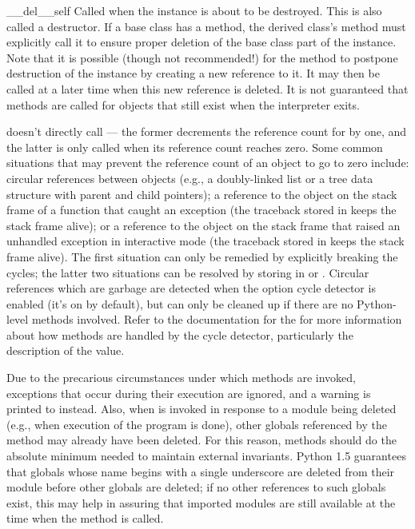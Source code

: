 \begin{methoddesc}[object]{__del__}{self}
Called when the instance is about to be destroyed.  This is also
called a destructor.  If a base class
has a  method, the derived class's  method
must explicitly call it to ensure proper deletion of the base class
part of the instance.  Note that it is possible (though not recommended!)
for the 
method to postpone destruction of the instance by creating a new
reference to it.  It may then be called at a later time when this new
reference is deleted.  It is not guaranteed that
 methods are called for objects that still exist when
the interpreter exits.

\begin{notice}
 doesn't directly call
 --- the former decrements the reference count for
 by one, and the latter is only called when its reference
count reaches zero.  Some common situations that may prevent the
reference count of an object to go to zero include: circular
references between objects (e.g., a doubly-linked list or a tree data
structure with parent and child pointers); a reference to the object
on the stack frame of a function that caught an exception (the
traceback stored in  keeps the stack frame
alive); or a reference to the object on the stack frame that raised an
unhandled exception in interactive mode (the traceback stored in
 keeps the stack frame alive).  The first
situation can only be remedied by explicitly breaking the cycles; the
latter two situations can be resolved by storing  in
 or .  Circular
references which are garbage are detected when the option cycle
detector is enabled (it's on by default), but can only be cleaned up
if there are no Python-level  methods involved.
Refer to the documentation for the  for more information about how
 methods are handled by the cycle detector,
particularly the description of the  value.
\end{notice}

\begin{notice}[warning]
Due to the precarious circumstances under which
 methods are invoked, exceptions that occur during their
execution are ignored, and a warning is printed to 
instead.  Also, when  is invoked in response to a module
being deleted (e.g., when execution of the program is done), other
globals referenced by the  method may already have been
deleted.  For this reason,  methods should do the
absolute minimum needed to maintain external invariants.  Python 1.5
guarantees that globals whose name begins with a single underscore are
deleted from their module before other globals are deleted; if no
other references to such globals exist, this may help in assuring that
imported modules are still available at the time when the
 method is called.
\end{notice}
\end{methoddesc}

